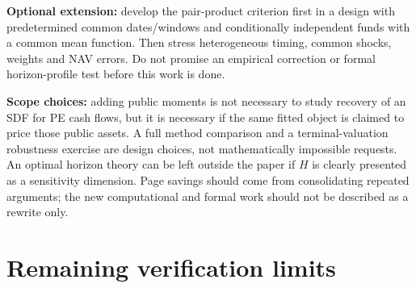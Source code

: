 \documentclass[11pt]{article}
\theoremstyle{plain}
\theoremstyle{definition}
\begin{document}
\textbf{Optional extension:} develop the pair-product criterion first in a design with predetermined common dates/windows and conditionally independent funds with a common mean function. Then stress heterogeneous timing, common shocks, weights and NAV errors. Do not promise an empirical correction or formal horizon-profile test before this work is done.

\textbf{Scope choices:} adding public moments is not necessary to study recovery of an SDF for PE cash flows, but it is necessary if the same fitted object is claimed to price those public assets. A full method comparison and a terminal-valuation robustness exercise are design choices, not mathematically impossible requests. An optimal horizon theory can be left outside the paper if $H$ is clearly presented as a sensitivity dimension. Page savings should come from consolidating repeated arguments; the new computational and formal work should not be described as a rewrite only.

\clearpage
\section{Remaining verification limits}
\label{sec:notverified}
\end{document}
